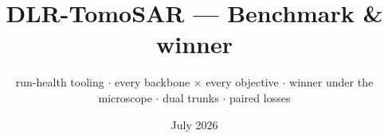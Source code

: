\documentclass[aspectratio=169,9pt]{beamer}
\title{\textbf{DLR-TomoSAR --- Benchmark \& winner}}
\subtitle{run-health tooling \; $\cdot$ \; every backbone $\times$ every objective \; $\cdot$ \; winner under the microscope \; $\cdot$ \; dual trunks \; $\cdot$ \; paired losses}
\date{\small July 2026}
\author{}
\begin{document}
\begin{frame}[plain]
  \titlepage
\end{frame}




\end{document}
